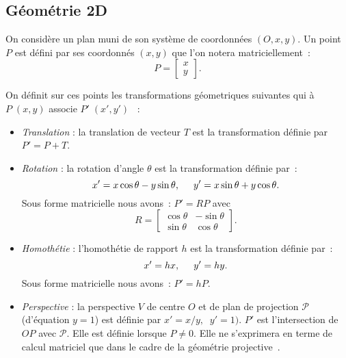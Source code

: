 \documentclass[a4paper,11pt]{amsart}
\newcommand{\PP}{{\mathcal P}} \newcommand{\QQ}{{\mathcal Q}}
\begin{document}
\subsection{G\'eom\'etrie 2D}
On consid\`ere un plan muni de son syst\`eme de coordonn\'ees 
$(O,x,y)$.  Un point $P$ est d\'efini par ses coordonn\'es $(x,y)$ que 
l'on notera matriciellement~: $$P=\begin{bmatrix}x\\y\end{bmatrix}.$$

On d\'efinit sur ces points les transformations g\'eometriques 
suivantes qui \`a $P\;(x,y)$ associe $P'\;(x',y')$ ~:
\begin{itemize}
\item\emph{Translation} : la translation de vecteur $T$ est la 
transformation d\'efinie par $P'=P+T$.\vspace{0.2cm}
%
\item\emph{Rotation} : la rotation d'angle $\theta$ est la 
transformation d\'efinie par~: $$x'=x\cos \theta -y \sin 
\theta,\hspace{0.5cm}y'=x \sin \theta +y \cos \theta.$$ Sous forme 
matricielle nous avons~: $P'=R P$ avec $$R=\begin{bmatrix}\cos\theta & 
-\sin\theta \\ \sin\theta & \cos\theta\end{bmatrix}.$$\vspace{0.1cm}
%
\item\emph{Homoth\'etie} : l'homoth\'etie de rapport $h$ est la 
transformation d\'efinie par~: $$x'=hx,\hspace{0.5cm}y'=hy.$$ Sous 
forme matricielle nous avons~: $P'=hP$.\vspace{0.2cm}
%
\item\emph{Perspective} : la perspective $V$ de centre $O$ et de plan 
de projection $\PP$ (d'\'equation $y=1$) est d\'efinie par 
$x'=x/y,\;\;y'=1).$ $P'$ est l'intersection de $OP$ avec $\PP$.  Elle 
est d\'efinie lorsque $P\not= 0.$ Elle ne s'exprimera en terme de 
calcul matriciel que dans le cadre de la g\'eom\'etrie 
projective~\cite{FOLE95}.
\end{itemize}
\end{document}
